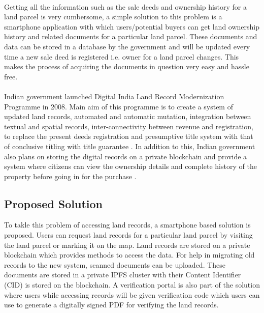 \documentclass{article}
\begin{document}
        \paragraph{}
        Getting all the information such as the sale deeds and ownership history for a land parcel is very cumbersome, a simple solution to this problem is a smartphone application with which users/potential buyers can get land ownership history and related documents for a particular land parcel. These documents and data can be stored in a database by the government and will be updated every time a new sale deed is registered i.e. owner for a land parcel changes. This makes the process of acquiring the documents in question very easy and hassle free.

        \paragraph{}
        Indian government launched Digital India Land Record Modernization Programme in 2008. Main aim of this programme is to create a system of updated land records, automated and automatic mutation, integration between textual and spatial records, inter-connectivity between revenue and registration, to replace the present deeds registration and presumptive title system with that of conclusive titling with title guarantee \cite{dilrmp}. In addition to this, Indian government also plans on storing the digital records on a private blockchain and provide a system where citizens can view the ownership details and complete history of the property before going in for the purchase \cite{blockchaingovin}.  

    \subsection{Proposed Solution}
        To takle this problem of accessing land records, a smartphone based solution is proposed. Users can request land records for a particular land parcel by visiting the land parcel or marking it on the map. Land records are stored on a private blockchain which provides methods to access the data. For help in migrating old records to the new system, scanned documents can be uploaded. These documents are stored in a private IPFS cluster with their Content Identifier (CID) is stored on the blockchain. A verification portal is also part of the solution where users while accessing records will be given verification code which users can use to generate a digitally signed PDF for verifying the land records. 
        
\end{document}
